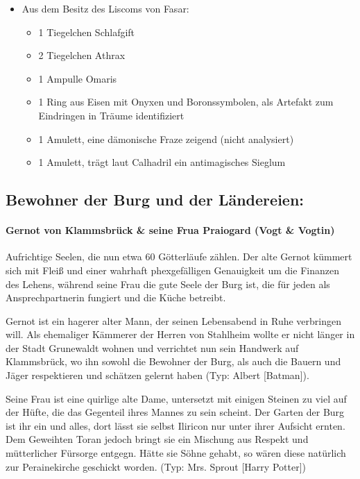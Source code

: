 \begin{itemize}
\begin{itemize}
    \end{itemize}
    \item Aus dem Besitz des Liscoms von Fasar:
    \begin{itemize}
        \item 1 Tiegelchen Schlafgift
        \item 2 Tiegelchen Athrax
        \item 1 Ampulle Omaris
        \item 1 Ring aus Eisen mit Onyxen und Boronssymbolen, als Artefakt zum Eindringen in Träume identifiziert
        \item 1 Amulett, eine dämonische Fraze zeigend (nicht analysiert)
        \item 1 Amulett, trägt laut Calhadril ein antimagisches Sieglum
    \end{itemize}
\end{itemize}
\subsection{Bewohner der Burg und der Ländereien:}

\paragraph{Gernot von Klammsbrück \& seine Frua Praiogard (Vogt \& Vogtin)}
Aufrichtige Seelen, die nun etwa 60 Götterläufe zählen. Der alte Gernot kümmert sich mit Fleiß und einer wahrhaft phexgefälligen Genauigkeit um die Finanzen des Lehens, während seine Frau die gute Seele der Burg ist, die für jeden als Ansprechpartnerin fungiert und die Küche betreibt.

Gernot ist ein hagerer alter Mann, der seinen Lebensabend in Ruhe verbringen will. Als ehemaliger Kämmerer der Herren von Stahlheim wollte er nicht länger in der Stadt Grunewaldt wohnen und verrichtet nun sein Handwerk auf Klammsbrück, wo ihn sowohl die Bewohner der Burg, als auch die Bauern und Jäger respektieren und schätzen gelernt haben (Typ: Albert [Batman]).

Seine Frau ist eine quirlige alte Dame, untersetzt mit einigen Steinen zu viel auf der Hüfte, die das Gegenteil ihres Mannes zu sein scheint. Der Garten der Burg ist ihr ein und alles, dort lässt sie selbst Iliricon nur unter ihrer Aufsicht ernten. Dem Geweihten Toran jedoch bringt sie ein Mischung aus Respekt und mütterlicher Fürsorge entgegn. Hätte sie Söhne gehabt, so wären diese natürlich zur Perainekirche geschickt worden. (Typ: Mrs. Sprout [Harry Potter])

